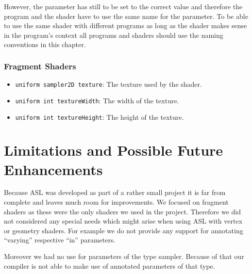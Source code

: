 \documentclass[11pt,a4paper]{scrreprt}
\begin{document}
However, the parameter has still to be set to the correct value and therefore 
the program and the shader have to use the same name for the parameter. To be 
able to use the same shader with different programs as long as the shader makes 
sense in the program's context all programs and shaders should use the naming 
conventions in this chapter.

\subsection{Fragment Shaders}
\begin{itemize}
    \item \lstinline$uniform sampler2D texture$: The texture used by the shader.
    \item \lstinline$uniform int textureWidth$: The width of the texture.
    \item \lstinline$uniform int textureHeight$: The height of the texture.
\end{itemize}

\appendix
\chapter{Limitations and Possible Future Enhancements}
Because ASL was developed as part of a rather small project it is far from 
complete and leaves much room for improvements. We focused on fragment shaders 
as these were the only shaders we used in the project. Therefore we did not 
considered any special needs which might arise when using ASL with vertex or 
geometry shaders. For example we do not provide any support for annotating 
``varying'' respective ``in'' parameters.

Moreover we had no use for parameters of the type sampler. Because of that our 
compiler is not able to make use of annotated parameters of that type.
\end{document}
